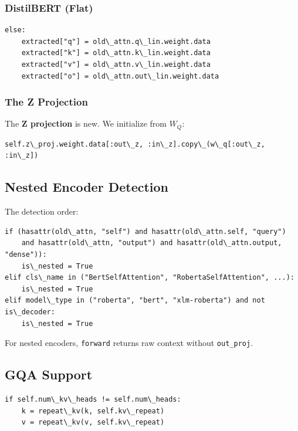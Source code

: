 \subsubsection{DistilBERT (Flat)}

\begin{lstlisting}
else:
    extracted["q"] = old\_attn.q\_lin.weight.data
    extracted["k"] = old\_attn.k\_lin.weight.data
    extracted["v"] = old\_attn.v\_lin.weight.data
    extracted["o"] = old\_attn.out\_lin.weight.data
\end{lstlisting}

\subsubsection{The Z Projection}

The \textbf{Z projection} is new. We initialize from $W_Q$:

\begin{lstlisting}
self.z\_proj.weight.data[:out\_z, :in\_z].copy\_(w\_q[:out\_z, :in\_z])
\end{lstlisting}

\subsection{Nested Encoder Detection}

The detection order:

\begin{lstlisting}
if (hasattr(old\_attn, "self") and hasattr(old\_attn.self, "query")
    and hasattr(old\_attn, "output") and hasattr(old\_attn.output, "dense")):
    is\_nested = True
elif cls\_name in ("BertSelfAttention", "RobertaSelfAttention", ...):
    is\_nested = True
elif model\_type in ("roberta", "bert", "xlm-roberta") and not is\_decoder:
    is\_nested = True
\end{lstlisting}

For nested encoders, \texttt{forward} returns raw context without \texttt{out\_proj}.

\subsection{GQA Support}

\begin{lstlisting}
if self.num\_kv\_heads != self.num\_heads:
    k = repeat\_kv(k, self.kv\_repeat)
    v = repeat\_kv(v, self.kv\_repeat)
\end{lstlisting}

